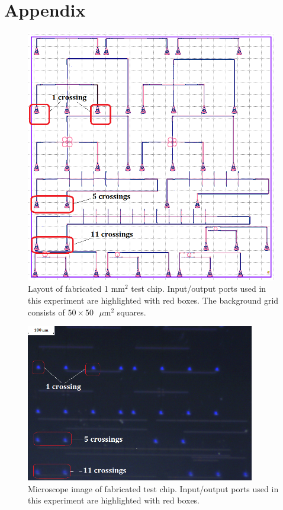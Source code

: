 \documentclass[aps,prl,twocolumn, superscriptaddress]{revtex4}
\begin{document}
\pagebreak 

\onecolumngrid
\appendix
\section{Appendix}
\begin{figure}[!h]
    \centering \includegraphics[width=11cm]{klayout.png}
    \caption{Layout of fabricated 1 mm$^2$ test chip. Input/output ports used in this experiment are highlighted with red boxes. The background grid consists of $50 \times 50 \text{ } \mu\text{m}^2$ squares.}
    \label{fig:klayout}
\end{figure}

\begin{figure}[!h]
    \centering \includegraphics[width=10cm]{swgcrosschip.png}
    \caption{Microscope image of fabricated test chip. Input/output ports used in this experiment are highlighted with red boxes.}
    \label{fig:microscopelayout}
\end{figure}
\pagebreak 
\end{document}
